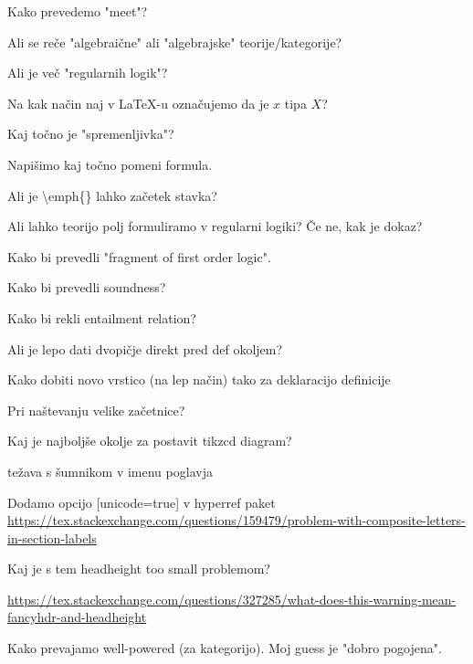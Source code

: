 \documentclass[12pt,a4paper]{article}
\newcommand\ans{\item[\textbf{A:}]}
\begin{document}
    \begin{vprasanja}
        \item Kako prevedemo "meet"?
        \ans
        \item Ali se reče "algebraične" ali "algebrajske" teorije/kategorije?
        \ans
        \item  Ali je več "regularnih logik"?
        \ans
        \item  Na kak način naj v \LaTeX -u označujemo da je $x$ tipa $X$?
        \ans
        \item  Kaj točno je "spremenljivka"?
        \ans
        \item  Napišimo kaj točno pomeni formula.
        \ans
        \item  Ali je \textbackslash emph\{\textasteriskcentered \} lahko začetek stavka?
        \ans
        \item  Ali lahko teorijo polj formuliramo v regularni logiki? Če ne, kak je dokaz?
        \ans
        \item  Kako bi prevedli "fragment of first order logic".
        \ans
        \item  Kako bi prevedli soundness?
        \ans
        \item  Kako bi rekli entailment relation?
        \ans
        \item Ali je lepo dati dvopičje direkt pred def okoljem?
        \ans
        \item Kako dobiti novo vrstico (na lep način) tako za deklaracijo definicije
        \ans 
        \item Pri naštevanju velike začetnice?
        \ans
        \item Kaj je najboljše okolje za postavit tikzcd diagram?
        \ans
        \item težava s šumnikom v imenu poglavja
        \ans Dodamo opcijo [unicode=true] v hyperref paket
        \url{https://tex.stackexchange.com/questions/159479/problem-with-composite-letters-in-section-labels}
        \item Kaj je s tem headheight too small problemom?
        \ans \url{https://tex.stackexchange.com/questions/327285/what-does-this-warning-mean-fancyhdr-and-headheight}
        \item Kako prevajamo well-powered (za kategorijo). Moj guess je "dobro pogojena".
        \ans
    \end{vprasanja}
\end{document}

